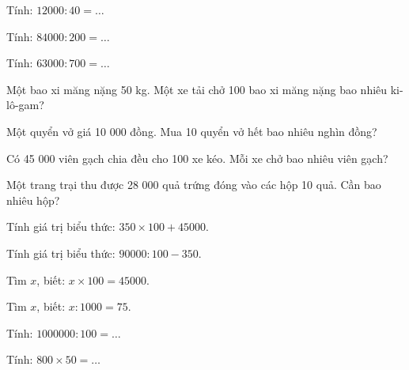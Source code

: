 \begin{ex}
Tính: $12000 : 40 = \dots$
\end{ex}

\begin{ex}
Tính: $84000 : 200 = \dots$
\end{ex}

\begin{ex}
Tính: $63000 : 700 = \dots$
\end{ex}

\begin{ex}
Một bao xi măng nặng 50 kg. Một xe tải chở 100 bao xi măng nặng bao nhiêu ki-lô-gam?
\end{ex}

\begin{ex}
Một quyển vở giá 10 000 đồng. Mua 10 quyển vở hết bao nhiêu nghìn đồng?
\end{ex}

\begin{ex}
Có 45 000 viên gạch chia đều cho 100 xe kéo. Mỗi xe chở bao nhiêu viên gạch?
\end{ex}

\begin{ex}
Một trang trại thu được 28 000 quả trứng đóng vào các hộp 10 quả. Cần bao nhiêu hộp?
\end{ex}

\begin{ex}
Tính giá trị biểu thức: $350 \times 100 + 45000$.
\end{ex}

\begin{ex}
Tính giá trị biểu thức: $90000 : 100 - 350$.
\end{ex}

\begin{ex}
Tìm $x$, biết: $x \times 100 = 45000$.
\end{ex}

\begin{ex}
Tìm $x$, biết: $x : 1000 = 75$.
\end{ex}

\begin{ex}
Tính: $1000000 : 100 = \dots$
\end{ex}

\begin{ex}
Tính: $800 \times 50 = \dots$
\end{ex}
